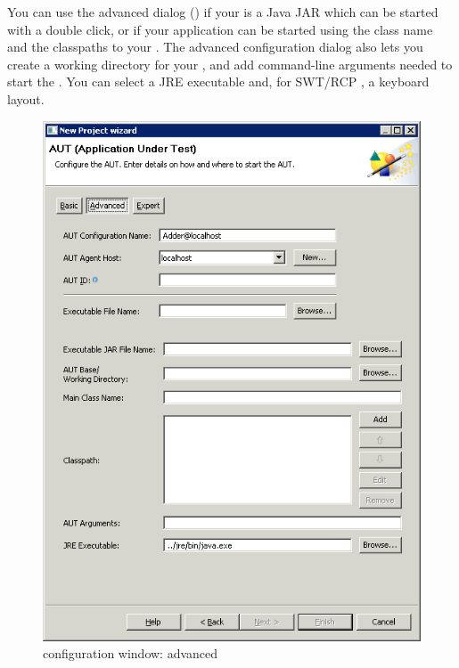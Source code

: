You can use the advanced dialog () if your \gdaut{} is a Java JAR which can be started with a double click, or if your application can be started using the class name and the classpaths to your \gdaut{}.  The advanced configuration dialog also lets you create a working directory for your \gdaut{}, and add command-line arguments needed to start the \gdaut{}. You can select a JRE executable and, for SWT/RCP \gdauts{}, a keyboard layout.

\begin{figure}[h]
\begin{center}
\includegraphics{Tasks/AUTs/PS/autconfigwindowadvanced}
\caption{\gdaut configuration window: advanced}
\label{autconfigadvanced}
\end{center}
\end{figure}

